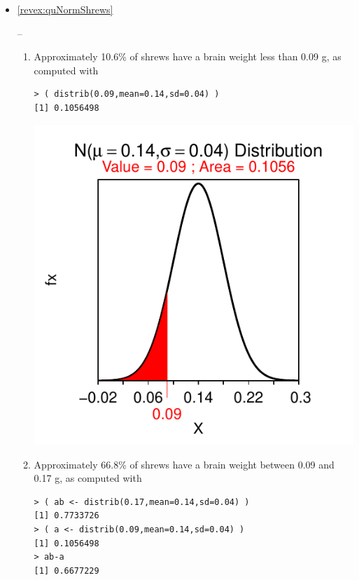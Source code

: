 \documentclass[10pt,openany]{book}\usepackage[]{graphicx}\usepackage[]{color}
\makeatletter
\newenvironment{kframe}{%
 \def\at@end@of@kframe{}%
 \ifinner\ifhmode%
  \def\at@end@of@kframe{\end{minipage}}%
  \begin{minipage}{\columnwidth}%
 \fi\fi%
 \def\FrameCommand##1{\hskip\@totalleftmargin \hskip-\fboxsep
 \colorbox{shadecolor}{##1}\hskip-\fboxsep
     \hskip-\linewidth \hskip-\@totalleftmargin \hskip\columnwidth}%
 \MakeFramed {\advance\hsize-\width
   \@totalleftmargin\z@ \linewidth\hsize
   \@setminipage}}%
 {\par\unskip\endMakeFramed%
 \at@end@of@kframe}
\newenvironment{knitrout}{}{} %
\makeatother
\begin{document}
\begin{itemize}
  \item \hypertarget{ans:quNormShrews}{\ref{revex:quNormShrews}} --
    \begin{enumerate}
      \item Approximately 10.6\% of shrews have a brain weight less than 0.09 g, as computed with
\begin{knitrout}
\color{fgcolor}\begin{kframe}
\begin{verbatim}
> ( distrib(0.09,mean=0.14,sd=0.04) )
[1] 0.1056498
\end{verbatim}
\end{kframe}

{\centering \includegraphics[width=.4\linewidth]{Figs/unnamed-chunk-229-1} 

}



\end{knitrout}
      \item Approximately 66.8\% of shrews have a brain weight between 0.09 and 0.17 g, as computed with
\begin{knitrout}
\color{fgcolor}\begin{kframe}
\begin{verbatim}
> ( ab <- distrib(0.17,mean=0.14,sd=0.04) )
[1] 0.7733726
> ( a <- distrib(0.09,mean=0.14,sd=0.04) )
[1] 0.1056498
> ab-a
[1] 0.6677229
\end{verbatim}
\end{kframe}


\end{knitrout}
\end{enumerate}
\end{itemize}
\end{document}
